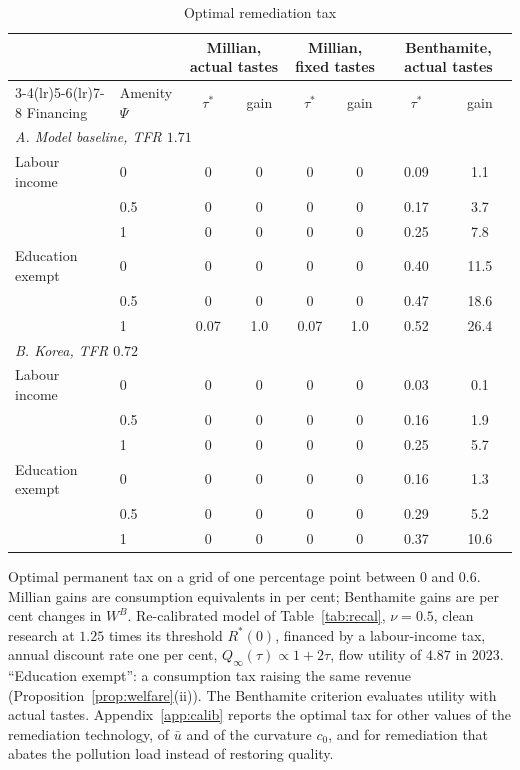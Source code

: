 \documentclass[11pt]{article}
\begin{document}
\begin{table}[h!]\centering
\begin{threeparttable}
\caption{Optimal remediation tax}
\label{tab:welfare}
\footnotesize
\setlength{\tabcolsep}{5pt}
\begin{tabular}{llcccccc}
\toprule
 & & \multicolumn{2}{c}{Millian, actual tastes} & \multicolumn{2}{c}{Millian, fixed tastes} & \multicolumn{2}{c}{Benthamite, actual tastes}\\
\cmidrule(lr){3-4}\cmidrule(lr){5-6}\cmidrule(lr){7-8}
Financing & Amenity $\Psi$ & $\tau^\ast$ & gain & $\tau^\ast$ & gain & $\tau^\ast$ & gain\\
\midrule
\multicolumn{8}{l}{\emph{A. Model baseline, TFR $1.71$}}\\
Labour income   & 0   & 0    & 0    & 0    & 0    & 0.09 & 1.1\\
                & 0.5 & 0    & 0    & 0    & 0    & 0.17 & 3.7\\
                & 1   & 0    & 0    & 0    & 0    & 0.25 & 7.8\\
Education exempt& 0   & 0    & 0    & 0    & 0    & 0.40 & 11.5\\
                & 0.5 & 0    & 0    & 0    & 0    & 0.47 & 18.6\\
                & 1   & 0.07 & 1.0  & 0.07 & 1.0  & 0.52 & 26.4\\
\midrule
\multicolumn{8}{l}{\emph{B. Korea, TFR $0.72$}}\\
Labour income   & 0   & 0    & 0    & 0    & 0    & 0.03 & 0.1\\
                & 0.5 & 0    & 0    & 0    & 0    & 0.16 & 1.9\\
                & 1   & 0    & 0    & 0    & 0    & 0.25 & 5.7\\
Education exempt& 0   & 0    & 0    & 0    & 0    & 0.16 & 1.3\\
                & 0.5 & 0    & 0    & 0    & 0    & 0.29 & 5.2\\
                & 1   & 0    & 0    & 0    & 0    & 0.37 & 10.6\\
\bottomrule
\end{tabular}
\begin{tablenotes}\footnotesize
\item Optimal permanent tax on a grid of one percentage point between $0$ and $0.6$. Millian gains are consumption equivalents in
per cent; Benthamite gains are per cent changes in $W^{B}$. Re-calibrated model of Table~\ref{tab:recal},
$\nu=0.5$, clean research at $1.25$ times its threshold $R^\ast(0)$, financed by a labour-income tax, annual
discount rate one per cent, $Q_\infty(\tau)\propto1+2\tau$, flow utility of $4.87$ in 2023. ``Education exempt'': a
consumption tax raising the same revenue (Proposition~\ref{prop:welfare}(ii)). The Benthamite criterion
evaluates utility with actual tastes.
Appendix~\ref{app:calib} reports the optimal tax for other values of the remediation technology, of
$\bar u$ and of the curvature $c_0$, and for remediation that abates the pollution load instead of
restoring quality.
\end{tablenotes}
\end{threeparttable}
\end{table}
\end{document}
